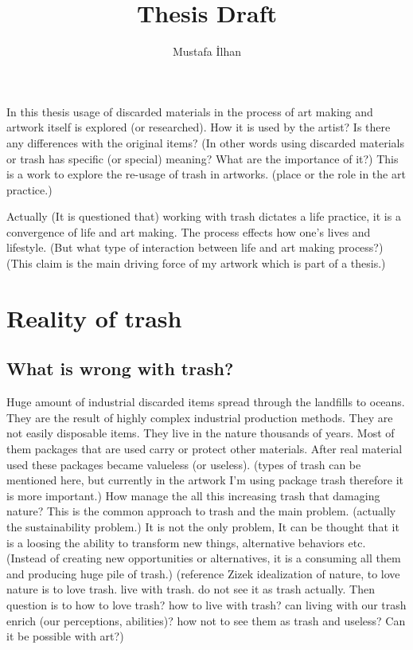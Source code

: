 \documentclass{article}
\title{Thesis Draft}
\author{Mustafa İlhan}
\begin{document}
\maketitle

In this thesis usage of discarded materials in the process of art making and artwork itself is explored (or researched). How it is used by the artist? Is there any differences with the original items? (In other words using discarded materials or trash has specific (or special) meaning? What are the importance of it?) This is a work to explore the re-usage of trash in artworks. (place or the role in the art practice.)

Actually (It is questioned that) working with trash dictates a life practice, it is a convergence of life and art making. The process effects how one's lives and lifestyle. (But what type of interaction between life and art making process?) (This claim is the main driving force of my artwork which is part of a thesis.)

\section{Reality of trash}
\subsection{What is wrong with trash?}
Huge amount of industrial discarded items spread through the landfills to oceans. They are the result of highly complex industrial production methods. They are not easily disposable items. They live in the nature thousands of years. Most of them packages that are used carry or protect other materials. After real material used these packages became valueless (or useless). (types of trash can be mentioned here, but currently in the artwork I'm using package trash therefore it is more important.) How manage the all this increasing trash that damaging nature?  This is the common approach to trash and the main problem. (actually the sustainability problem.) It is not the only problem, It can be thought that it is a loosing the ability to transform new things, alternative behaviors etc. (Instead of creating new opportunities or alternatives, it is a consuming all them and producing huge pile of trash.) (reference Zizek idealization of nature, to love nature is to love trash. live with trash. do not see it as trash actually. Then question is to how to love trash? how to live with trash? can living with our trash enrich (our perceptions, abilities)? how not to see them as trash and useless? Can it be possible with art?)
\end{document}
